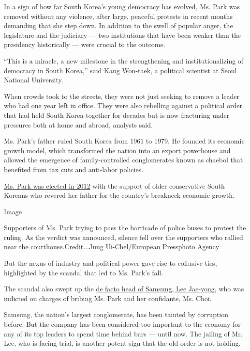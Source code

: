 In a sign of how far South Korea's young democracy has evolved, Ms. Park
was removed without any violence, after large, peaceful protests in
recent months demanding that she step down. In addition to the swell of
popular anger, the legislature and the judiciary --- two institutions
that have been weaker than the presidency historically --- were crucial
to the outcome.

``This is a miracle, a new milestone in the strengthening and
institutionalizing of democracy in South Korea,'' said Kang Won-taek, a
political scientist at Seoul National University.

When crowds took to the streets, they were not just seeking to remove a
leader who had one year left in office. They were also rebelling against
a political order that had held South Korea together for decades but is
now fracturing under pressures both at home and abroad, analysts said.

Ms. Park's father ruled South Korea from 1961 to 1979. He founded its
economic growth model, which transformed the nation into an export
powerhouse and allowed the emergence of family-controlled conglomerates
known as chaebol that benefited from tax cuts and anti-labor policies.

\href{http://www.nytimes.com/2012/12/20/world/asia/south-koreans-vote-in-closely-fought-presidential-race.html}{Ms.
Park was elected in 2012} with the support of older conservative South
Koreans who revered her father for the country's breakneck economic
growth.

Image

Supporters of Ms. Park trying to pass the barricade of police buses to
protest the ruling. As the verdict was announced, silence fell over the
supporters who rallied near the courthouse.Credit...Jung
Ui-Chel/European Pressphoto Agency

But the nexus of industry and political power gave rise to collusive
ties, highlighted by the scandal that led to Ms. Park's fall.

The scandal also swept up the
\href{https://www.nytimes.com/2017/03/09/business/jay-y-lee-samsung-trial.html}{de
facto head of Samsung, Lee Jae-yong}, who was indicted on charges of
bribing Ms. Park and her confidante, Ms. Choi.

Samsung, the nation's largest conglomerate, has been tainted by
corruption before. But the company has been considered too important to
the economy for any of its top leaders to spend time behind bars ---
until now. The jailing of Mr. Lee, who is facing trial, is another
potent sign that the old order is not holding.

